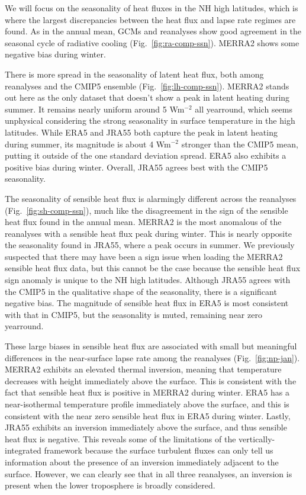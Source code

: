 \documentclass{article}
\begin{document}
We will focus on the seasonality of heat fluxes in the NH high latitudes, which is where the largest discrepancies between the heat flux and lapse rate regimes are found. As in the annual mean, GCMs and reanalyses show good agreement in the seasonal cycle of radiative cooling (Fig.~\ref{fig:ra-comp-ssn}). MERRA2 shows some negative bias during winter.

There is more spread in the seasonality of latent heat flux, both among reanalyses and the CMIP5 ensemble (Fig.~\ref{fig:lh-comp-ssn}). MERRA2 stands out here as the only dataset that doesn't show a peak in latent heating during summer. It remains nearly uniform around 5 Wm$^{-2}$ all yearround, which seems unphysical considering the strong seasonality in surface temperature in the high latitudes. While ERA5 and JRA55 both capture the peak in latent heating during summer, its magnitude is about 4 Wm$^{-2}$ stronger than the CMIP5 mean, putting it outside of the one standard deviation spread. ERA5 also exhibits a positive bias during winter. Overall, JRA55 agrees best with the CMIP5 seasonality.

The seasonality of sensible heat flux is alarmingly different across the reanalyses (Fig.~\ref{fig:sh-comp-ssn}), much like the disagreement in the sign of the sensible heat flux found in the annual mean. MERRA2 is the most anomalous of the reanalyses with a sensible heat flux peak during winter. This is nearly opposite the seasonality found in JRA55, where a peak occurs in summer. We previously suspected that there may have been a sign issue when loading the MERRA2 sensible heat flux data, but this cannot be the case because the sensible heat flux sign anomaly is unique to the NH high latitudes. Although JRA55 agrees with the CMIP5 in the qualitative shape of the seasonality, there is a significant negative bias. The magnitude of sensible heat flux in ERA5 is most consistent with that in CMIP5, but the seasonality is muted, remaining near zero yearround.

These large biases in sensible heat flux are associated with small but meaningful differences in the near-surface lapse rate among the reanalyses (Fig.~\ref{fig:np-jan}). MERRA2 exhibits an elevated thermal inversion, meaning that  temperature decreases with height immediately above the surface. This is consistent with the fact that sensible heat flux is positive in MERRA2 during winter. ERA5 has a near-isothermal temperature profile immediately above the surface, and this is consistent with the near zero sensible heat flux in ERA5 during winter. Lastly, JRA55 exhibits an inversion immediately above the surface, and thus sensible heat flux is negative. This reveals some of the limitations of the vertically-integrated framework because the surface turbulent fluxes can only tell us information about the presence of an inversion immediately adjacent to the surface. However, we can clearly see that in all three reanalyses, an inversion is present when the lower troposphere is broadly considered. 
\end{document}

